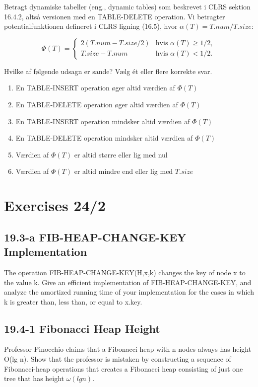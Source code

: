 \documentclass{article}
\theoremstyle{definition}
\begin{document}
\begin{enumerate}
    Betragt dynamiske tabeller (eng., dynamic tables) som beskrevet i CLRS sektion 16.4.2, altså versionen med en TABLE-DELETE operation. Vi betragter potentialfunktionen defineret i CLRS ligning (16.5), hvor $\alpha(T) = T.num/T.size$:

    \[ \Phi(T) = \begin{cases}
    2(T.num - T.size/2) & \text{hvis } \alpha(T) \geq 1/2, \\
    T.size - T.num & \text{hvis } \alpha(T) < 1/2 .
    \end{cases} \]

    Hvilke af følgende udsagn er sande? Vælg ét eller flere korrekte svar.

    \begin{enumerate}
        \item En TABLE-INSERT operation øger altid værdien af $\Phi(T)$
        \item En TABLE-DELETE operation øger altid værdien af $\Phi(T)$
        \item En TABLE-INSERT operation mindsker altid værdien af $\Phi(T)$
        \item En TABLE-DELETE operation mindsker altid værdien af $\Phi(T)$
        \item Værdien af $\Phi(T)$ er altid større eller lig med nul
        \item Værdien af $\Phi(T)$ er altid mindre end eller lig med $T.size$
    \end{enumerate}

\end{enumerate}


\section{Exercises 24/2}


\subsection{19.3-a FIB-HEAP-CHANGE-KEY Implementation}
The operation FIB-HEAP-CHANGE-KEY(H,x,k) changes the key of node x to the value k. Give an efficient implementation of FIB-HEAP-CHANGE-KEY, and analyze the amortized running time of your implementation for the cases in which k is greater than, less than, or equal to x.key.





\subsection{19.4-1 Fibonacci Heap Height}
Professor Pinocchio claims that a Fibonacci heap with n nodes always has height O(lg n). Show that the professor is mistaken by constructing a sequence of Fibonacci-heap operations that creates a Fibonacci heap consisting of just one tree that has height $\omega(lg n)$.
\end{document}
